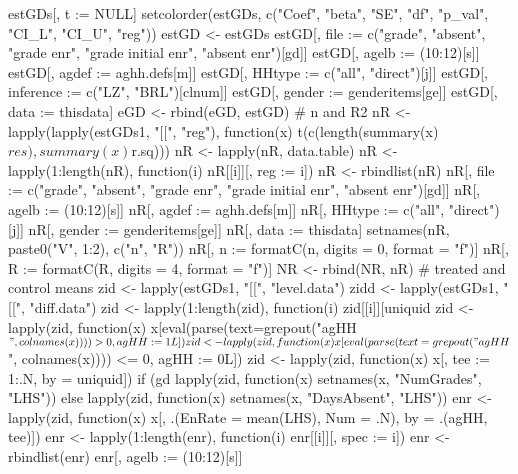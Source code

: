 \begin{Schunk}
\begin{Sinput}
{{{{{{{{{                  estGDs[, t := NULL]
                }
                setcolorder(estGDs,  c("Coef", "beta", "SE", "df", "p_val", "CI_L", "CI_U", "reg"))
                estGD <- estGDs
                estGD[, file := c("grade", "absent", "grade enr", "grade initial enr", "absent enr")[gd]]
                estGD[, agelb := (10:12)[s]]
                estGD[, agdef := aghh.defs[m]]
                estGD[, HHtype := c("all", "direct")[j]]
                estGD[, inference := c("LZ", "BRL")[clnum]]
                estGD[, gender := genderitems[ge]]
                estGD[, data := thisdata]
                eGD <- rbind(eGD, estGD)
                # n and R2
                nR <- lapply(lapply(estGDs1, "[[", "reg"), 
                  function(x) t(c(length(summary(x)$res), summary(x)$r.sq)))
                nR <- lapply(nR, data.table)
                nR <- lapply(1:length(nR), function(i) nR[[i]][, reg := i])
                nR <- rbindlist(nR)
                nR[, file := c("grade", "absent", "grade enr", "grade initial enr", "absent enr")[gd]]
                nR[, agelb := (10:12)[s]]
                nR[, agdef := aghh.defs[m]]
                nR[, HHtype := c("all", "direct")[j]]
                nR[, gender := genderitems[ge]]
                nR[, data := thisdata]
                setnames(nR, paste0("V", 1:2), c("n", "R"))
                nR[, n := formatC(n, digits = 0, format = "f")]
                nR[, R := formatC(R, digits = 4, format = "f")]
                NR <- rbind(NR, nR)
                # treated and control means
                zid <- lapply(estGDs1, "[[", "level.data")
                zidd <- lapply(estGDs1, "[[", "diff.data")
                zid <- lapply(1:length(zid), function(i) zid[[i]][uniquid %in% zidd[[i]][, uniquid], ])
                zid <- lapply(zid, function(x) x[eval(parse(text=grepout("agHH$", colnames(x)))) > 0, 
                          agHH := 1L])
                zid <- lapply(zid, function(x) x[eval(parse(text=grepout("agHH$", colnames(x)))) <= 0, 
                          agHH := 0L])
                zid <- lapply(zid, function(x) x[, tee := 1:.N, by = uniquid])
                if (gd %in% c(1, 3, 4)) 
                  lapply(zid, function(x) setnames(x, "NumGrades", "LHS")) else
                  lapply(zid, function(x) setnames(x, "DaysAbsent", "LHS"))
                enr <- lapply(zid, function(x) x[, .(EnRate = mean(LHS), Num = .N), by = .(agHH, tee)])
                enr <- lapply(1:length(enr), function(i) enr[[i]][, spec := i])
                enr <- rbindlist(enr)
                enr[, agelb := (10:12)[s]]
}}}}}}}}
\end{Sinput}
\end{Schunk}
